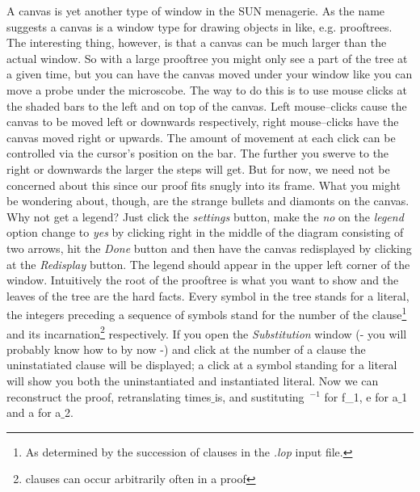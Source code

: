 A canvas is yet another type of window in the SUN menagerie. As the name suggests a canvas is a window
type for drawing objects in like, e.g. prooftrees. The interesting thing, however, is that a canvas can be
much larger than the actual window. So with a large prooftree you might only see a part of the tree
at a given time, but you can have the canvas moved under your window like you can move a probe under
the microscobe. The way to do this is to use mouse clicks at the shaded bars to the left and on top
of the canvas. Left mouse--clicks cause the canvas to be moved left or downwards respectively, right mouse--clicks
have the canvas moved right or upwards. The amount of movement at each click can be controlled via
the cursor's position on the bar. The further you swerve to the right or downwards the larger the steps
will get.
But for now, we need not be concerned about this since our proof fits snugly into its frame.
What you might be wondering about, though, are the strange bullets and diamonts on the canvas.
Why not get a legend? Just click the {\it settings\/} button, make the {\it no\/} on the {\it legend\/} option
change to {\it yes\/} by clicking right in the middle of the diagram consisting of two arrows, hit
the {\it Done\/} button and then have the canvas redisplayed by clicking at the {\it Redisplay\/} button.
The legend should appear in the upper left corner of the window. 
Intuitively the root of the prooftree is what you want to show and the
leaves of the tree are the hard facts. 
Every symbol in the tree stands for a literal, the integers preceding a sequence of symbols stand for
the number of the clause\footnote{As determined by the succession of clauses in the {\it .lop\/} input 
file.} and its incarnation\footnote{clauses can occur arbitrarily often in a proof} respectively.
If you open the {\it Substitution\/} window (- you will probably know how to by now -) and click at
the number of a clause the uninstatiated clause will be displayed; a click at a symbol standing for
a literal will show you both the uninstantiated and instantiated literal.
Now we can reconstruct the proof, retranslating times$\_$is, and sustituting $\,^{-1}$ for f\_1, e for a$\_$1 and
a for a$\_$2.

